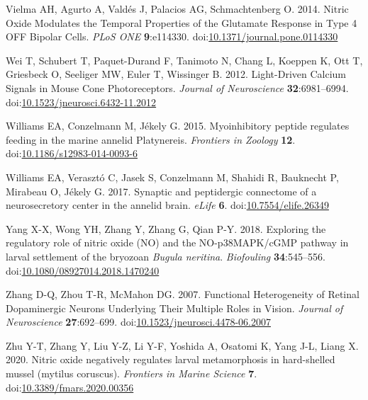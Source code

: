 \documentclass[
  10pt,
  onecolumn]{article}
\newlength{\cslhangindent}
\newlength{\cslentryspacingunit} %
\newenvironment{CSLReferences}[2] %
 {%
  \setlength{\parindent}{0pt}
  \ifodd #1
  \let\oldpar\par
  \def\par{\hangindent=\cslhangindent\oldpar}
  \fi
  \setlength{\parskip}{#2\cslentryspacingunit}
 }%
 {}
\begin{document}
\begin{CSLReferences}{1}{0}
\leavevmode{}%
Vielma AH, Agurto A, Valdés J, Palacios AG, Schmachtenberg O. 2014.
Nitric Oxide Modulates the Temporal Properties of the Glutamate Response
in Type 4 OFF Bipolar Cells. \emph{PLoS ONE} \textbf{9}:e114330.
doi:\href{https://doi.org/10.1371/journal.pone.0114330}{10.1371/journal.pone.0114330}

\leavevmode{}%
Wei T, Schubert T, Paquet-Durand F, Tanimoto N, Chang L, Koeppen K, Ott
T, Griesbeck O, Seeliger MW, Euler T, Wissinger B. 2012. Light-Driven
Calcium Signals in Mouse Cone Photoreceptors. \emph{Journal of
Neuroscience} \textbf{32}:6981--6994.
doi:\href{https://doi.org/10.1523/jneurosci.6432-11.2012}{10.1523/jneurosci.6432-11.2012}

\leavevmode{}%
Williams EA, Conzelmann M, Jékely G. 2015. Myoinhibitory peptide
regulates feeding in the marine annelid Platynereis. \emph{Frontiers in
Zoology} \textbf{12}.
doi:\href{https://doi.org/10.1186/s12983-014-0093-6}{10.1186/s12983-014-0093-6}

\leavevmode{}%
Williams EA, Verasztó C, Jasek S, Conzelmann M, Shahidi R, Bauknecht P,
Mirabeau O, Jékely G. 2017. Synaptic and peptidergic connectome of a
neurosecretory center in the annelid brain. \emph{eLife} \textbf{6}.
doi:\href{https://doi.org/10.7554/elife.26349}{10.7554/elife.26349}

\leavevmode{}%
Yang X-X, Wong YH, Zhang Y, Zhang G, Qian P-Y. 2018. Exploring the
regulatory role of nitric oxide (NO) and the NO-p38MAPK/cGMP pathway in
larval settlement of the bryozoan {\emph{Bugula neritina}}.
\emph{Biofouling} \textbf{34}:545--556.
doi:\href{https://doi.org/10.1080/08927014.2018.1470240}{10.1080/08927014.2018.1470240}

\leavevmode{}%
Zhang D-Q, Zhou T-R, McMahon DG. 2007. Functional Heterogeneity of
Retinal Dopaminergic Neurons Underlying Their Multiple Roles in Vision.
\emph{Journal of Neuroscience} \textbf{27}:692--699.
doi:\href{https://doi.org/10.1523/jneurosci.4478-06.2007}{10.1523/jneurosci.4478-06.2007}

\leavevmode{}%
Zhu Y-T, Zhang Y, Liu Y-Z, Li Y-F, Yoshida A, Osatomi K, Yang J-L, Liang
X. 2020. Nitric oxide negatively regulates larval metamorphosis in
hard-shelled mussel (mytilus coruscus). \emph{Frontiers in Marine
Science} \textbf{7}.
doi:\href{https://doi.org/10.3389/fmars.2020.00356}{10.3389/fmars.2020.00356}

\end{CSLReferences}
\end{document}
